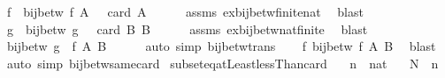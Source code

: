\begin{isabellebody}
\ f\ \ {\isachardoublequoteopen}bij{\isacharunderscore}{\kern0pt}betw\ f\ A\ {\isacharbraceleft}{\kern0pt}{}\ {\isachardot}{\kern0pt}{\isachardot}{\kern0pt}{\isacharless}{\kern0pt}\ card\ A{\isacharbraceright}{\kern0pt}{\isachardoublequoteclose}\isanewline
\ \ \ \ \isamarkupfalse%
\ assms\ ex{\isacharunderscore}{\kern0pt}bij{\isacharunderscore}{\kern0pt}betw{\isacharunderscore}{\kern0pt}finite{\isacharunderscore}{\kern0pt}nat\ \isamarkupfalse%
\ blast\isanewline
\ \ \isamarkupfalse%
\ \isamarkupfalse%
\ g\ \ {\isachardoublequoteopen}bij{\isacharunderscore}{\kern0pt}betw\ g\ {\isacharbraceleft}{\kern0pt}{}\ {\isachardot}{\kern0pt}{\isachardot}{\kern0pt}{\isacharless}{\kern0pt}\ card\ B{\isacharbraceright}{\kern0pt}\ B{\isachardoublequoteclose}\isanewline
\ \ \ \ \isamarkupfalse%
\ assms\ ex{\isacharunderscore}{\kern0pt}bij{\isacharunderscore}{\kern0pt}betw{\isacharunderscore}{\kern0pt}nat{\isacharunderscore}{\kern0pt}finite\ \isamarkupfalse%
\ blast\isanewline
\ \ \isamarkupfalse%
\ \isamarkupfalse%
\ {\isachardoublequoteopen}bij{\isacharunderscore}{\kern0pt}betw\ {\isacharparenleft}{\kern0pt}g\ {\isasymcirc}\ f{\isacharparenright}{\kern0pt}\ A\ B{\isachardoublequoteclose}\isanewline
\ \ \ \ \isamarkupfalse%
\ {\isacharparenleft}{\kern0pt}auto\ simp{\isacharcolon}{\kern0pt}\ bij{\isacharunderscore}{\kern0pt}betw{\isacharunderscore}{\kern0pt}trans{\isacharparenright}{\kern0pt}\isanewline
\ \ \isamarkupfalse%
\ {\isachardoublequoteopen}{\isacharparenleft}{\kern0pt}{\isasymexists}f{\isachardot}{\kern0pt}\ bij{\isacharunderscore}{\kern0pt}betw\ f\ A\ B{\isacharparenright}{\kern0pt}{\isachardoublequoteclose}\ \isamarkupfalse%
\ blast\isanewline
{}\isamarkupfalse%
\ {\isacharparenleft}{\kern0pt}auto\ simp{\isacharcolon}{\kern0pt}\ bij{\isacharunderscore}{\kern0pt}betw{\isacharunderscore}{\kern0pt}same{\isacharunderscore}{\kern0pt}card{\isacharparenright}{\kern0pt}%
\endisatagproof
{\isafoldproof}%
%
\isadelimproof
\isanewline
%
\endisadelimproof
\isanewline
{}\isamarkupfalse%
\ subset{\isacharunderscore}{\kern0pt}eq{\isacharunderscore}{\kern0pt}atLeast{}{\isacharunderscore}{\kern0pt}lessThan{\isacharunderscore}{\kern0pt}card{\isacharcolon}{\kern0pt}\isanewline
\ \ \ n\ {\isacharcolon}{\kern0pt}{\isacharcolon}{\kern0pt}\ nat\isanewline
\ \ \ {\isachardoublequoteopen}N\ {\isasymsubseteq}\ {\isacharbraceleft}{\kern0pt}{}{\isachardot}{\kern0pt}{\isachardot}{\kern0pt}{\isacharless}{\kern0pt}n{\isacharbraceright}{\kern0pt}{\isachardoublequoteclose}\isanewline

\end{isabellebody}
